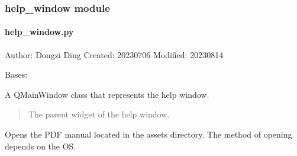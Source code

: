 \documentclass[a4paper,10pt,english]{sphinxmanual}
\begin{document}
\subsubsection{help\_window module}
\label{\detokenize{gui:module-src.gui.help_window}}\label{\detokenize{gui:help-window-module}}

\paragraph{help\_window.py}
\label{\detokenize{gui:help-window-py}}
\sphinxAtStartPar
Author: Dongzi Ding
Created: 2023\sphinxhyphen{}07\sphinxhyphen{}06
Modified: 2023\sphinxhyphen{}08\sphinxhyphen{}14

\begin{fulllineitems}
\label{\detokenize{gui:src.gui.help_window.HelpWindow}}
\pysigstartsignatures
{}
\pysigstopsignatures
\sphinxAtStartPar
Bases: 

\sphinxAtStartPar
A QMainWindow class that represents the help window.
\begin{description}
\begin{quote}\begin{description}
\sphinxAtStartPar
The parent widget of the help window.

\end{description}\end{quote}

\end{description}

\begin{fulllineitems}
\label{\detokenize{gui:src.gui.help_window.HelpWindow.open_pdf_manual}}
\pysigstartsignatures
{}
\pysigstopsignatures
\sphinxAtStartPar
Opens the PDF manual located in the assets directory. The method of opening depends on the OS.

\end{fulllineitems}


\end{fulllineitems}
\end{document}
